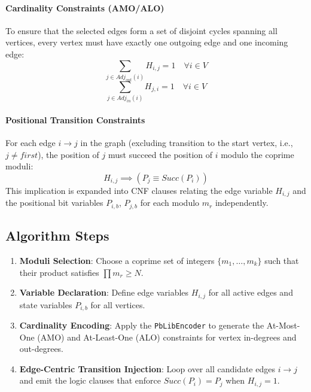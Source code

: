 \paragraph{Cardinality Constraints (AMO/ALO)}
To ensure that the selected edges form a set of disjoint cycles spanning all vertices, every vertex must have exactly one outgoing edge and one incoming edge:
\begin{equation}
    \sum_{j \in Adj_{out}(i)} H_{i,j} = 1 \quad \forall i \in V
\end{equation}
\begin{equation}
    \sum_{j \in Adj_{in}(i)} H_{j,i} = 1 \quad \forall i \in V
\end{equation}

\paragraph{Positional Transition Constraints}
For each edge $i \to j$ in the graph (excluding transition to the start vertex, i.e., $j \neq first$), the position of $j$ must succeed the position of $i$ modulo the coprime moduli:
\begin{equation}
    H_{i,j} \implies \left( P_{j} \equiv Succ(P_{i}) \right)
\end{equation}
This implication is expanded into CNF clauses relating the edge variable $H_{i,j}$ and the positional bit variables $P_{i,b}$, $P_{j,b}$ for each modulo $m_r$ independently.

\subsection{Algorithm Steps}
\begin{enumerate}
    \item \textbf{Moduli Selection}: Choose a coprime set of integers $\{m_1, \dots, m_k\}$ such that their product satisfies $\prod m_r \ge N$.
    \item \textbf{Variable Declaration}: Define edge variables $H_{i,j}$ for all active edges and state variables $P_{i,b}$ for all vertices.
    \item \textbf{Cardinality Encoding}: Apply the \texttt{PbLibEncoder} to generate the At-Most-One (AMO) and At-Least-One (ALO) constraints for vertex in-degrees and out-degrees.
    \item \textbf{Edge-Centric Transition Injection}: Loop over all candidate edges $i \to j$ and emit the logic clauses that enforce $Succ(P_i) = P_j$ when $H_{i,j} = 1$.
\end{enumerate}

